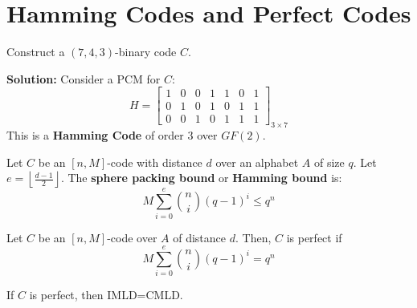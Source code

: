 \section{Hamming Codes and Perfect Codes}

\begin{exbox}
    \begin{example}
        Construct a $ (7,4,3) $-binary code $ C $.

        \textbf{Solution:}
        Consider a PCM for $ C $:
        \[H= \left[
                \begin{array}{ccc|cccc}
                    1 & 0 & 0 & 1 & 1 & 0 & 1 \\
                    0 & 1 & 0 & 1 & 0 & 1 & 1 \\
                    0 & 0 & 1 & 0 & 1 & 1 & 1
                \end{array} \right]_{3\times 7} \]
        This is a \textbf{Hamming Code} of order $ 3 $ over $ GF(2) $.
    \end{example}
\end{exbox}

\begin{defbox}
    \begin{definition}
        Let $ C $ be an $ [n,M] $-code with distance $ d $ over an
        alphabet $ A $ of size $ q $. Let $ e=\left\lfloor \frac{d-1}{2} \right\rfloor $.
        The \textbf{sphere packing bound} or \textbf{Hamming bound} is:
        \[ M \sum\limits_{i=0}^{e} \binom{n}{i}(q-1)^i\leqslant q^n \]
    \end{definition} \end{defbox}

\begin{defbox}
    \begin{definition}
        Let $ C $ be an $ [n,M] $-code over $ A $ of distance $ d $. Then,
        $ C $ is perfect if
        \[ M \sum\limits_{i=0}^{e} \binom{n}{i}(q-1)^i = q^n \]
    \end{definition} \end{defbox}

 If $ C $ is perfect, then IMLD=CMLD.